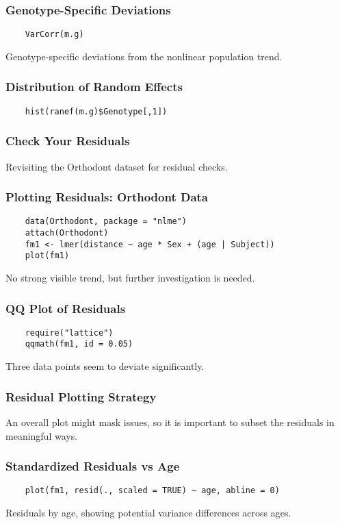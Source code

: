 \documentclass{beamer}
\begin{document}
\begin{frame}[fragile]
    \frametitle{Genotype-Specific Deviations}
    \lstset{style=Rstyle}
    \begin{lstlisting}
    VarCorr(m.g)
    \end{lstlisting}
    Genotype-specific deviations from the nonlinear population trend.
\end{frame}

\begin{frame}[fragile]
    \frametitle{Distribution of Random Effects}
    \lstset{style=Rstyle}
    \begin{lstlisting}
    hist(ranef(m.g)$Genotype[,1])
    \end{lstlisting}
\end{frame}

\begin{frame}
    \frametitle{Check Your Residuals}
    Revisiting the Orthodont dataset for residual checks.
\end{frame}

\begin{frame}[fragile]
    \frametitle{Plotting Residuals: Orthodont Data}
    \lstset{style=Rstyle}
    \begin{lstlisting}
    data(Orthodont, package = "nlme")
    attach(Orthodont)
    fm1 <- lmer(distance ~ age * Sex + (age | Subject))
    plot(fm1)
    \end{lstlisting}
    No strong visible trend, but further investigation is needed.
\end{frame}

\begin{frame}[fragile]
    \frametitle{QQ Plot of Residuals}
    \lstset{style=Rstyle}
    \begin{lstlisting}
    require("lattice")
    qqmath(fm1, id = 0.05)
    \end{lstlisting}
    Three data points seem to deviate significantly.
\end{frame}

\begin{frame}
    \frametitle{Residual Plotting Strategy}
    An overall plot might mask issues, so it is important to subset the residuals in meaningful ways.
\end{frame}

\begin{frame}[fragile]
    \frametitle{Standardized Residuals vs Age}
    \lstset{style=Rstyle}
    \begin{lstlisting}
    plot(fm1, resid(., scaled = TRUE) ~ age, abline = 0)
    \end{lstlisting}
    Residuals by age, showing potential variance differences across ages.
\end{frame}
\end{document}

